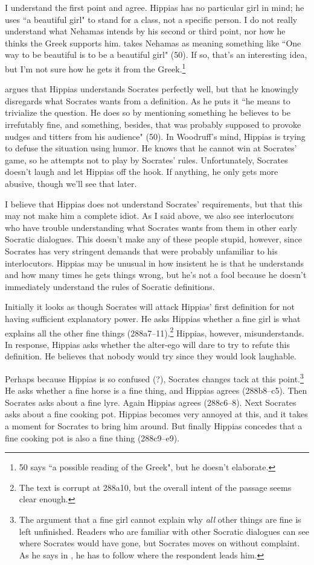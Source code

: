 \documentclass[11pt]{article}
\begin{document}
I understand the first point and agree.  Hippias has no particular girl in
mind; he uses ``a beautiful girl" to stand for a class, not a specific
person.  I do not really understand what Nehamas intends by his second or
third point, nor how he thinks the Greek supports him.
\citet{woodruff1982} takes Nehamas as meaning something like ``One way to
be beautiful is to be a beautiful girl" (50).  If so, that's an interesting
idea, but I'm not sure how he gets it from the
Greek.\footnote{\citet{woodruff1982} 50 says ``a possible reading of the
Greek", but he doesn't elaborate.}

\citet{woodruff1982} argues that Hippias understands Socrates perfectly
well, but that he knowingly disregards what Socrates wants from
a definition.  As he puts it ``he means to trivialize the question.  He
does so by mentioning something he believes to be irrefutably fine, and
something, besides, that was probably supposed to provoke nudges and
titters from his audience" (50).  In Woodruff's mind, Hippias is trying to
defuse the situation using humor.  He knows that he cannot win at Socrates'
game, so he attempts not to play by Socrates' rules.  Unfortunately,
Socrates doesn't laugh and let Hippias off the hook.  If anything, he only
gets more abusive, though we'll see that later.

I believe that Hippias does not understand Socrates' requirements, but that
this may not make him a complete idiot.  As I said above, we also see
interlocutors who have trouble understanding what Socrates wants from them
in other early Socratic dialogues.  This doesn't make any of these people
stupid, however, since Socrates has very stringent demands that were
probably unfamiliar to his interlocutors.  Hippias may be unusual in how
insistent he is that he understands and how many times he gets things
wrong, but he's not a fool because he doesn't immediately understand the
rules of Socratic definitions.

Initially it looks as though Socrates will attack Hippias' first definition
for not having sufficient explanatory power.  He asks Hippias whether
a fine girl is what explains all the other fine things
(288a7--11).\footnote{The text is corrupt at 288a10, but the overall intent
of the passage seems clear enough.} Hippias, however, misunderstands.  In
response, Hippias asks whether the alter-ego will dare to try to refute
this definition.  He believes that nobody would try since they would look
laughable.

Perhaps because Hippias is so confused (?), Socrates changes tack at this
point.\footnote{The argument that a fine girl cannot explain why \emph{all}
other things are fine is left unfinished.  Readers who are familiar
with other Socratic dialogues can see where Socrates would have gone,
but Socrates moves on without complaint.  As he says in ,
he has to follow where the respondent leads him.}  He asks whether a fine
horse is a fine thing, and Hippias agrees (288b8--c5).  Then Socrates asks
about a fine lyre. Again Hippias agrees (288c6--8).  Next Socrates asks
about a fine cooking pot.  Hippias becomes very annoyed at this, and it
takes a moment for Socrates to bring him around.  But finally Hippias
concedes that a fine cooking pot is also a fine thing (288c9--e9).
\end{document}

